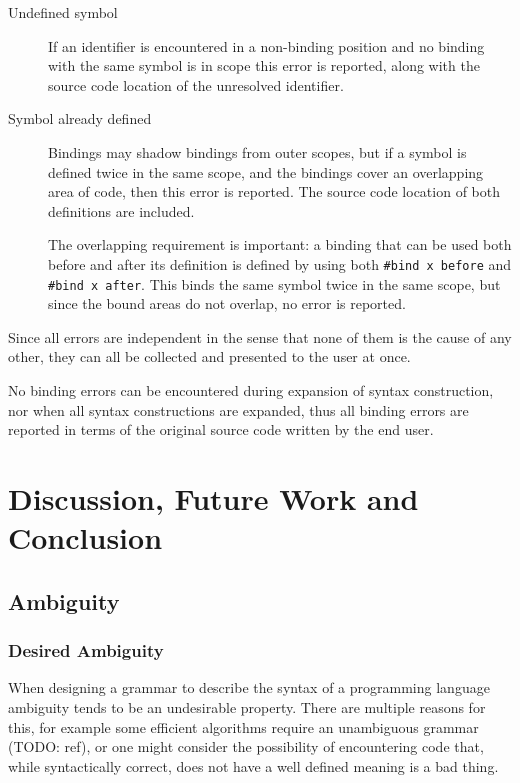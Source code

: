 \documentclass{kththesis}
\begin{document}
\begin{description}
  \item[Undefined symbol] If an identifier is encountered in a non-binding position and no binding with the same symbol is in scope this error is reported, along with the source code location of the unresolved identifier.

  \item[Symbol already defined] Bindings may shadow bindings from outer scopes, but if a symbol is defined twice in the same scope, and the bindings cover an overlapping area of code, then this error is reported. The source code location of both definitions are included.

  The overlapping requirement is important: a binding that can be used both before and after its definition is defined by using both \texttt{#bind x before} and \texttt{#bind x after}. This binds the same symbol twice in the same scope, but since the bound areas do not overlap, no error is reported.
\end{description}

Since all errors are independent in the sense that none of them is the cause of any other, they can all be collected and presented to the user at once.

No binding errors can be encountered during expansion of syntax construction, nor when all syntax constructions are expanded, thus all binding errors are reported in terms of the original source code written by the end user.

\chapter{Discussion, Future Work and Conclusion}

\section{Ambiguity} \label{sec:discussion-ambiguity}

\subsection{Desired Ambiguity}

When designing a grammar to describe the syntax of a programming language ambiguity tends to be an undesirable property. There are multiple reasons for this, for example some efficient algorithms require an unambiguous grammar (TODO: ref), or one might consider the possibility of encountering code that, while syntactically correct, does not have a well defined meaning is a bad thing.
\end{document}
